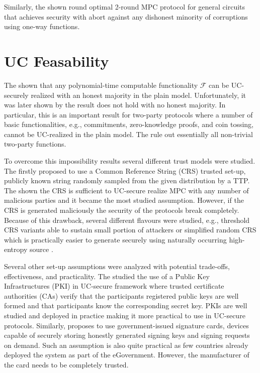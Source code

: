 \documentclass[
  digital, %
  twoside, %
  table,   %
  lof,     %
  lot,     %
]{fithesis3}
\theoremstyle{definition}
\theoremstyle{remark}
\begin{document}
Similarly, the \cite{cryptoeprint:2018:572} shown round optimal 2-round MPC protocol for general circuits that achieves security with abort against any dishonest minority of corruptions using one-way functions.


\section{UC Feasability}\label{sec:soa:uc_feasibility}
The \cite{Can01} shown that any polynomial-time computable functionality $\mathcal{F}$ can be UC-securely realized with an honest majority in the plain model. Unfortunately, it was later shown by \cite{CF01} the result does not hold with no honest majority. In particular, this is an important result for two-party protocols where a number of basic functionalities, e.g., commitments, zero-knowledge proofs, and coin tossing, cannot be UC-realized in the plain model. The \cite{Lin03, CKL04, CKL06} rule out essentially all non-trivial two-party functions.

To overcome this impossibility results several different trust models were studied. 
The \cite{CF01} firstly proposed to use a Common Reference String (CRS) trusted set-up, publicly known string randomly sampled from the given distribution by a TTP. The \cite{CLOS02} shown the CRS is sufficient to UC-secure realize MPC with any number of malicious parties and it became the most studied assumption. However, if the CRS is generated maliciously the security of the protocols break completely. Because of this drawback, several different flavours were studied, e.g., threshold CRS variants able to sustain small portion of attackers or simplified random CRS which is practically easier to generate securely using naturally occurring high-entropy source \cite{CPS07}.

Several other set-up assumptions were analyzed with potential trade-offs, effectiveness, and practicality. The \cite{BCNP04} studied the use of a Public Key Infrastructures (PKI) in UC-secure framework where trusted certificate authorities (CAs) verify that the participants registered public keys are well formed and that participants know the corresponding secret key. PKIs are well studied and deployed in practice making it more practical to use in UC-secure protocols. Similarly, \cite{HUU07} proposes to use government-issued signature cards, devices capable of securely storing honestly generated signing keys and signing requests on demand. Such an assumption is also quite practical as few countries already deployed the system as part of the eGovernment. However, the manufacturer of the card needs to be completely trusted.
\end{document}

